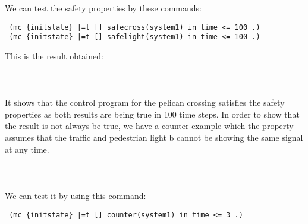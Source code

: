 \documentclass{article}
\begin{document}
We can test the safety properties by these commands:
\begin{verbatim} (mc {initstate} |=t [] safecross(system1) in time <= 100 .) 
 (mc {initstate} |=t [] safelight(system1) in time <= 100 .) \end{verbatim}
This is the result obtained:\\\\
\\\\
It shows that the control program for the pelican crossing satisfies the safety properties as both results are being true in 100 time steps. In order to show that the result is not always be true, we have a counter example which the property assumes that the traffic and pedestrian light b cannot be showing the same signal at any time. \\\\
\\\\
We can test it by using this command:
\begin{verbatim} (mc {initstate} |=t [] counter(system1) in time <= 3 .)  \end{verbatim}
\end{document}
